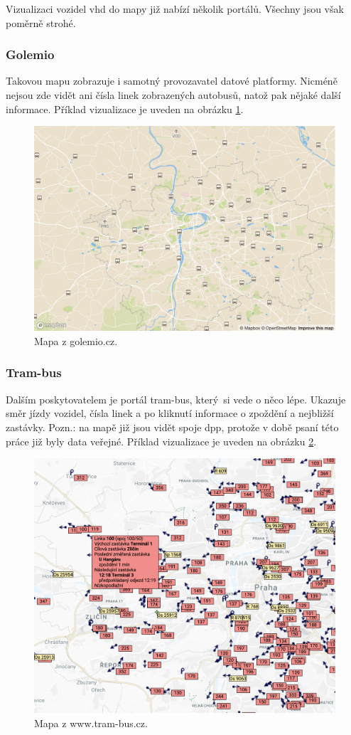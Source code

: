 Vizualizaci vozidel \gls{vhd} do mapy již nabízí několik portálů. Všechny jsou však poměrně strohé.

\subsubsection{Golemio}

Takovou mapu zobrazuje i samotný provozavatel datové platformy. Nicméně nejsou zde vidět ani čísla linek zobrazených autobusů, natož pak nějaké další informace. Příklad vizualizace je uveden na obrázku \ref{fig:golemio_result}.

\begin{figure}
	\centering
  \includegraphics[width=0.5\linewidth]{../img/golemio_mapa.png}
  \caption{Mapa z golemio.cz.}
  \label{fig:golemio_result}
\end{figure}

\subsubsection{Tram-bus}

Dalším poskytovatelem je portál tram-bus, který si vede o něco lépe. Ukazuje směr jízdy vozidel, čísla linek a po kliknutí informace o zpoždění a nejbližší zastávky. Pozn.: na mapě již jsou vidět spoje \gls{dpp}, protože v době psaní této práce již byly data veřejné. Příklad vizualizace je uveden na obrázku \ref{fig:tram-bus_result}.

\begin{figure}
	\centering
  \includegraphics[width=0.5\linewidth]{../img/tram-bus_mapa.png}
  \caption{Mapa z www.tram-bus.cz.}
  \label{fig:tram-bus_result}
\end{figure}


